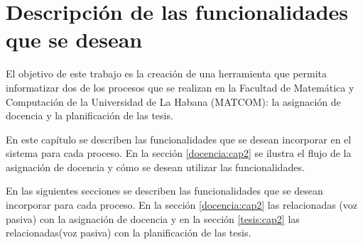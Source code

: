 \chapter{Descripción de las funcionalidades que se desean}\label{chapter:features}
El objetivo de este trabajo es la creación de una herramienta
que permita informatizar dos de los procesos que se realizan en la Facultad de Matemática y
Computación de la Universidad de La Habana (MATCOM): la asignación de docencia y la planificación de las tesis. 

En este capítulo se describen las funcionalidades que se desean incorporar
en el sistema para cada proceso. En la sección \ref{docencia:cap2} 
se ilustra el flujo de la asignación de docencia y cómo se desean utilizar 
las funcionalidades.


En las siguientes secciones se describen las funcionalidades
que se desean incorporar para cada proceso. En la sección \ref{docencia:cap2}
las relacionadas (voz pasiva) con la asignación de docencia y en la sección \ref{tesis:cap2}
las relacionadas(voz pasiva) con la planificación de las tesis.


















